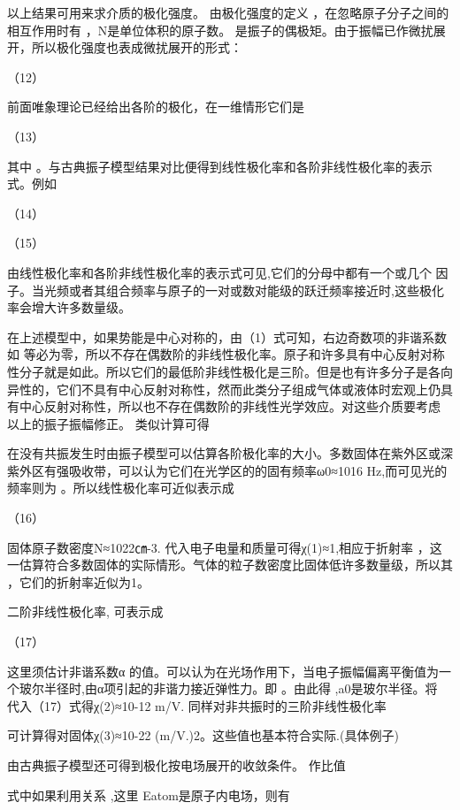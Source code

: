 以上结果可用来求介质的极化强度。 由极化强度的定义 ，在忽略原子分子之间的相互作用时有  ，N是单位体积的原子数。 是振子的偶极矩。由于振幅已作微扰展开，所以极化强度也表成微扰展开的形式：

                                         （12）

前面唯象理论已经给出各阶的极化，在一维情形它们是
          
                   （13）

其中 。与古典振子模型结果对比便得到线性极化率和各阶非线性极化率的表示式。例如

                              （14）     

                                     （15）    

由线性极化率和各阶非线性极化率的表示式可见,它们的分母中都有一个或几个 因子。当光频或者其组合频率与原子的一对或数对能级的跃迁频率接近时,这些极化率会增大许多数量级。

在上述模型中，如果势能是中心对称的，由（1）式可知，右边奇数项的非谐系数如 等必为零，所以不存在偶数阶的非线性极化率。原子和许多具有中心反射对称性分子就是如此。所以它们的最低阶非线性极化是三阶。但是也有许多分子是各向异性的，它们不具有中心反射对称性，然而此类分子组成气体或液体时宏观上仍具有中心反射对称性，所以也不存在偶数阶的非线性光学效应。对这些介质要考虑 以上的振子振幅修正。 类似计算可得

在没有共振发生时由振子模型可以估算各阶极化率的大小。多数固体在紫外区或深紫外区有强吸收带，可以认为它们在光学区的的固有频率ω0≈1016 Hz,而可见光的频率则为 。所以线性极化率可近似表示成

                                                         （16）    

固体原子数密度N≈1022㎝-3. 代入电子电量和质量可得χ(1)≈1,相应于折射率 ，这一估算符合多数固体的实际情形。气体的粒子数密度比固体低许多数量级，所以其 ，它们的折射率近似为1。 

二阶非线性极化率, 可表示成

                                                 （17）     

这里须估计非谐系数α 的值。可以认为在光场作用下，当电子振幅偏离平衡值为一个玻尔半径时,由α项引起的非谐力接近弹性力。即  。由此得   ,a0是玻尔半径。将  代入（17）式得χ(2)≈10-12 m/V. 同样对非共振时的三阶非线性极化率

可计算得对固体χ(3)≈10-22 (m/V.)2。这些值也基本符合实际.(具体例子)

由古典振子模型还可得到极化按电场展开的收敛条件。 作比值
        
式中如果利用关系   ,这里 Eatom是原子内电场，则有

